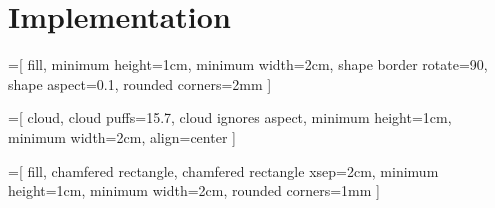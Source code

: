 \chapter{Implementation}

\def \mheight {1cm}
\def \mwidth {2cm}


=[
  fill, 
  minimum height=\mheight, 
  minimum width=\mwidth, 
  shape border rotate=90, 
  shape aspect=0.1,
  rounded corners=2mm
]

=[
  cloud, 
  cloud puffs=15.7, 
  cloud ignores aspect, 
  minimum height=\mheight,
  minimum width=\mwidth, 
  align=center
]

=[
  fill,
  chamfered rectangle,
  chamfered rectangle xsep=2cm,
  minimum height=\mheight, 
  minimum width=\mwidth,
  rounded corners=1mm
]



